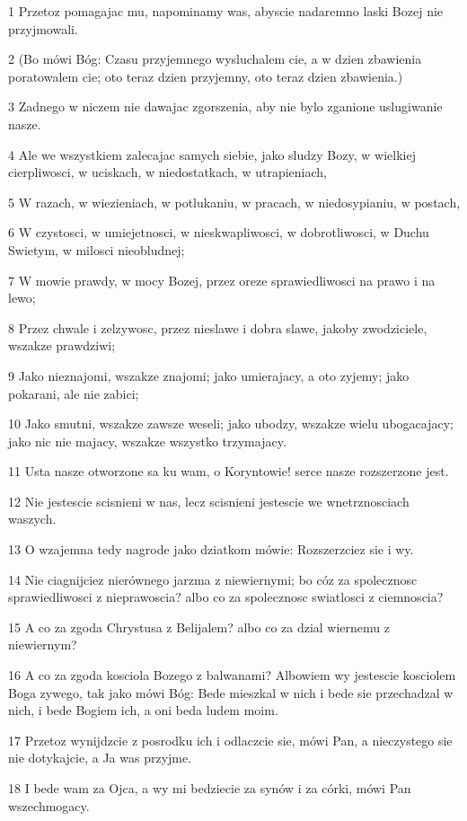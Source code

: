 \par 1 Przetoz pomagajac mu, napominamy was, abyscie nadaremno laski Bozej nie przyjmowali.
\par 2 (Bo mówi Bóg: Czasu przyjemnego wysluchalem cie, a w dzien zbawienia poratowalem cie; oto teraz dzien przyjemny, oto teraz dzien zbawienia.)
\par 3 Zadnego w niczem nie dawajac zgorszenia, aby nie bylo zganione uslugiwanie nasze.
\par 4 Ale we wszystkiem zalecajac samych siebie, jako sludzy Bozy, w wielkiej cierpliwosci, w uciskach, w niedostatkach, w utrapieniach,
\par 5 W razach, w wiezieniach, w potlukaniu, w pracach, w niedosypianiu, w postach,
\par 6 W czystosci, w umiejetnosci, w nieskwapliwosci, w dobrotliwosci, w Duchu Swietym, w milosci nieobludnej;
\par 7 W mowie prawdy, w mocy Bozej, przez oreze sprawiedliwosci na prawo i na lewo;
\par 8 Przez chwale i zelzywosc, przez nieslawe i dobra slawe, jakoby zwodziciele, wszakze prawdziwi;
\par 9 Jako nieznajomi, wszakze znajomi; jako umierajacy, a oto zyjemy; jako pokarani, ale nie zabici;
\par 10 Jako smutni, wszakze zawsze weseli; jako ubodzy, wszakze wielu ubogacajacy; jako nic nie majacy, wszakze wszystko trzymajacy.
\par 11 Usta nasze otworzone sa ku wam, o Koryntowie! serce nasze rozszerzone jest.
\par 12 Nie jestescie scisnieni w nas, lecz scisnieni jestescie we wnetrznosciach waszych.
\par 13 O wzajemna tedy nagrode jako dziatkom mówie: Rozszerzciez sie i wy.
\par 14 Nie ciagnijciez nierównego jarzma z niewiernymi; bo cóz za spolecznosc sprawiedliwosci z nieprawoscia? albo co za spolecznosc swiatlosci z ciemnoscia?
\par 15 A co za zgoda Chrystusa z Belijalem? albo co za dzial wiernemu z niewiernym?
\par 16 A co za zgoda kosciola Bozego z balwanami? Albowiem wy jestescie kosciolem Boga zywego, tak jako mówi Bóg: Bede mieszkal w nich i bede sie przechadzal w nich, i bede Bogiem ich, a oni beda ludem moim.
\par 17 Przetoz wynijdzcie z posrodku ich i odlaczcie sie, mówi Pan, a nieczystego sie nie dotykajcie, a Ja was przyjme.
\par 18 I bede wam za Ojca, a wy mi bedziecie za synów i za córki, mówi Pan wszechmogacy.

